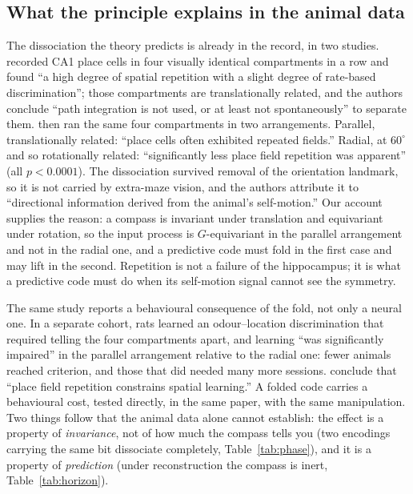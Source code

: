 \documentclass[9pt,lineno]{elife}
\begin{document}
\subsection*{What the principle explains in the animal data}

The dissociation the theory predicts is already in the record, in two studies. \citet{spiers2015}
recorded CA1 place cells in four visually identical compartments in a row and found ``a high degree of
spatial repetition with a slight degree of rate-based discrimination''; those compartments are
translationally related, and the authors conclude ``path integration is not used, or at least not
spontaneously'' to separate them. \citet{grieves2016} then ran the same four compartments in two
arrangements. Parallel, translationally related: ``place cells often exhibited repeated fields.''
Radial, at $60^\circ$ and so rotationally related: ``significantly less place field repetition was
apparent'' (all $p < 0.0001$). The dissociation survived removal of the orientation landmark, so it is
not carried by extra-maze vision, and the authors attribute it to ``directional information derived
from the animal's self-motion.'' Our account supplies the reason: a compass is invariant under
translation and equivariant under rotation, so the input process is $G$-equivariant in the parallel
arrangement and not in the radial one, and a predictive code must fold in the first case and may lift
in the second. Repetition is not a failure of the hippocampus; it is what a predictive code must do
when its self-motion signal cannot see the symmetry.

The same study reports a behavioural consequence of the fold, not only a neural one. In a separate
cohort, rats learned an odour--location discrimination that required telling the four compartments
apart, and learning ``was significantly impaired'' in the parallel arrangement relative to the radial
one: fewer animals reached criterion, and those that did needed many more sessions. \citet{grieves2016}
conclude that ``place field repetition constrains spatial learning.'' A folded code carries a
behavioural cost, tested directly, in the same paper, with the same manipulation. Two things follow
that the animal data alone cannot establish: the effect is a property of \emph{invariance}, not of how
much the compass tells you (two encodings carrying the same bit dissociate completely,
Table~\ref{tab:phase}), and it is a property of \emph{prediction} (under reconstruction the compass is
inert, Table~\ref{tab:horizon}).
\end{document}
